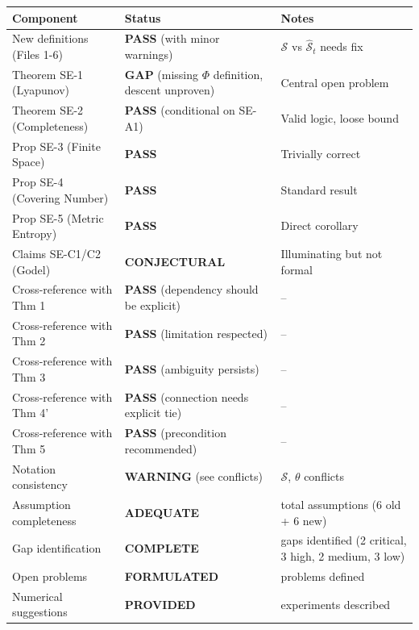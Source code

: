 \documentclass[
  12pt,
]{ctexart}
\begin{document}
\begin{longtable}[]{@{}
  >{\raggedright\arraybackslash}p{}
  >{\raggedright\arraybackslash}p{}
  >{\raggedright\arraybackslash}p{}@{}}
\toprule\noalign{}
\begin{minipage}[b]{\linewidth}\raggedright
Component
\end{minipage} & \begin{minipage}[b]{\linewidth}\raggedright
Status
\end{minipage} & \begin{minipage}[b]{\linewidth}\raggedright
Notes
\end{minipage} \\
\midrule\noalign{}
\endhead
\bottomrule\noalign{}
\endlastfoot
New definitions (Files 1-6) & \textbf{PASS} (with minor warnings) &
\(\mathcal{S}\) vs \(\hat{\mathcal{S}}_t\) needs fix \\
Theorem SE-1 (Lyapunov) & \textbf{GAP} (missing \(\Phi\) definition,
descent unproven) & Central open problem \\
Theorem SE-2 (Completeness) & \textbf{PASS} (conditional on SE-A1) &
Valid logic, loose bound \\
Prop SE-3 (Finite Space) & \textbf{PASS} & Trivially correct \\
Prop SE-4 (Covering Number) & \textbf{PASS} & Standard result \\
Prop SE-5 (Metric Entropy) & \textbf{PASS} & Direct corollary \\
Claims SE-C1/C2 (Godel) & \textbf{CONJECTURAL} & Illuminating but not
formal \\
Cross-reference with Thm 1 & \textbf{PASS} (dependency should be
explicit) & -- \\
Cross-reference with Thm 2 & \textbf{PASS} (limitation respected) &
-- \\
Cross-reference with Thm 3 & \textbf{PASS} (ambiguity persists) & -- \\
Cross-reference with Thm 4' & \textbf{PASS} (connection needs explicit
tie) & -- \\
Cross-reference with Thm 5 & \textbf{PASS} (precondition recommended) &
-- \\
Notation consistency & \textbf{WARNING} (see conflicts) &
\(\mathcal{S}\), \(\theta\) conflicts \\
Assumption completeness & \textbf{ADEQUATE} & 12 total assumptions (6
old + 6 new) \\
Gap identification & \textbf{COMPLETE} & 10 gaps identified (2 critical,
3 high, 2 medium, 3 low) \\
Open problems & \textbf{FORMULATED} & 5 problems defined \\
Numerical suggestions & \textbf{PROVIDED} & 5 experiments described \\
\end{longtable}
\end{document}

